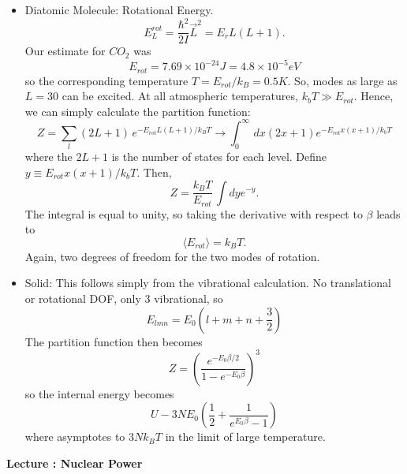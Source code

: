 \documentclass[11pt]{book}
\def\be{\begin{equation}}
\def\ee{\end{equation}}
\newcommand{\ec}[1]{Eq.~(\ref{eq:#1})}
\newcommand{\sfig}[2]{
\texttt{[image: \#1]}
        }
\newcommand{\Spng}[2]{
   \begin{figure}[thbp]
   \begin{center}
    \sfig{../Figures/#1.png}{0.7\columnwidth}
    \caption{{\small #2}}
    \label{fig:#1}
     \end{center}
   \end{figure}
}
\newcommand{\rf}[1]{\ref{fig:#1}}
\newcommand\bei{\begin{itemize}}
\newcommand\eei{\end{itemize}}
\newcommand\lecture[1]{\newpage
\addtocounter{lectureno}{1}
\setcounter{secno}{0}
\begin{center}
 {\bf Lecture \arabic{lectureno}: #1}
\end{center}
}
\newcounter{lectureno}
\newcounter{secno}
\begin{document}
\bei
\item Diatomic Molecule: Rotational Energy. 
\be E^{rot}_L = \frac{\hbar^2}{2I} \vec L^2 = E_r L(L+1).\ee
Our estimate for $CO_2$ was 
\be
E_{rot}=7.69\times 10^{-24} J = 4.8\times 10^{-5} eV\ee
so the corresponding temperature $T=E_{rot}/k_B=0.5K$. So, modes as large as $L=30$ can be excited. At all atmospheric temperatures, $k_bT\gg E_{rot}$. Hence, we can simply calculate the partition function:
\be
Z= \sum_l (2L+1)\,e^{-E_{rot}L(L+1)/k_BT} \rightarrow \int_0^\infty\, dx (2x+1)e^{-E_{rot}x(x+1)/k_bT}
\ee
where the $2L+1$ is the number of states for each level. Define $y\equiv E_{rot}x(x+1)/k_bT$. Then,
\be
Z= \frac{k_BT}{E_{rot}}\, \int dy e^{-y}
.\ee
The integral is equal to unity, so taking the derivative with respect to $\beta$ leads to
\be
\langle E_{rot}\rangle = k_BT.\ee
Again, two degrees of freedom for the two modes of rotation.
\item Solid: This follows simply from the vibrational calculation. No translational or rotational DOF, only 3 vibrational, so
\be
E_{lmn} = E_0\left (l+m+n+\frac32\right)\ee
The partition function then becomes
\be
Z= \left( \frac{e^{-E_0\beta/2}}{1-e^{-E_0\beta}} \right)^3\ee
so the internal energy becomes
\be
U - 3NE_0 \left( \frac12 + \frac1{e^{E_0\beta}-1} \right)\ee
where asymptotes to $3Nk_BT$ in the limit of large temperature.
\eei


\lecture{Nuclear Power}
\end{document}
